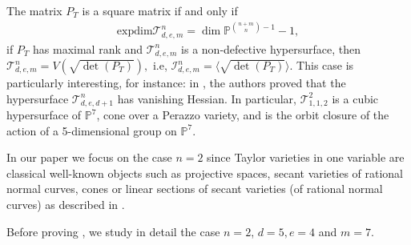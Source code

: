 \documentclass[letterpaper,11pt]{amsart}
\theoremstyle{plain}
\theoremstyle{definition}
\newcommand{\enm}[1]{\ensuremath{#1}}          %
\newcommand{\tv}{\mathcal{T}}
\newcommand{\PP}{\enm{\mathbb{P}}}
\newcommand{\ed}{\mathrm{exp dim}}
\begin{document}
The matrix $P_T$ is a square matrix if and only if \begin{align*}
\ed{\tv^n_{d,e,m}}=\dim \mathbb{P}^{{n+m \choose n}-1}-1,\end{align*}
if $P_T$ has maximal rank and   $\tv^n_{d,e,m}$ is a non-defective hypersurface, then $\tv^n_{d,e,m}=V(\sqrt{\det(P_T)}),$ i.e, $\mathcal{I}^n_{d,e,m}=\langle \sqrt{\det(P_T)} \rangle.$
This case is particularly interesting, for instance: in \cite[Theorem 4.4]{TV23}, the authors proved that the hypersurface $\tv_{d,e,d+1}^n$ has vanishing Hessian. In particular, $\tv_{1,1,2}^2$ is a cubic hypersurface of $\PP^7$, cone over a Perazzo variety, and is the orbit closure of the action
of a 5-dimensional group on $\PP^7$.

In our paper we focus on the case $n = 2$ since Taylor varieties in one variable are classical well-known objects such as projective spaces, secant varieties of rational normal curves, cones or linear sections of secant varieties (of rational normal curves) as described in \cite{TV23}.


Before proving , we study in detail the case $n=2$, $d=5, e=4$ and $m=7$. 
\end{document}
